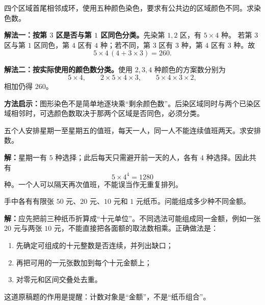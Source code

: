\begin{examplebox}
  四个区域首尾相邻成环，使用五种颜色染色，要求有公共边的区域颜色不同。求染色数。

  \begin{center}
  \end{center}

  \textbf{解法一：按第 $3$ 区是否与第 $1$ 区同色分类。}先染第 $1,2$ 区，有 $5\times4$ 种。
  若第 $3$ 区与第 $1$ 区同色，第 $4$ 区有 $4$ 种；若不同，第 $3$ 区有 $3$ 种，第 $4$ 区有 $3$ 种。故
  \[
    5\times4\,(4+3\times3)=260.
  \]

  \textbf{解法二：按实际使用的颜色数分类。}使用 $2,3,4$ 种颜色的方案数分别为
  \[
    5\times4,\qquad
    2\times5\times4\times3,\qquad
    5\times4\times3\times2,
  \]
  相加仍得 $260$。

  \textbf{方法启示：}图形染色不是简单地逐块乘“剩余颜色数”。后染区域同时与两个已染区域相邻时，可选颜色数取决于那两个区域是否同色，必须分类。
\end{examplebox}

\begin{examplebox}
  五个人安排星期一至星期五的值班，每天一人，同一人不能连续值班两天。求安排数。

  \textbf{解：}星期一有 $5$ 种选择；此后每天只需避开前一天的人，各有 $4$ 种选择。因此共有
  \[
    5\times4^4=1280
  \]
  种。一个人可以隔天再次值班，不能误当作无重复排列。
\end{examplebox}

\begin{examplebox}
  手中各有有限张 $50$ 元、$20$ 元、$10$ 元和 $1$ 元纸币。问能组成多少种不同金额。

  \textbf{解：}应先把前三种纸币折算成“十元单位”。不同选法可能组成同一金额，例如一张 $20$ 元与两张 $10$ 元，不能直接把各面额的取法数相乘。正确做法是：
  \begin{enumerate}
    \item 先确定可组成的十元整数是否连续，并列出缺口；
    \item 再把可用的一元张数加到每个十元金额上；
    \item 对零元和区间交叠处去重。
  \end{enumerate}
  这道原稿题的作用是提醒：计数对象是“金额”，不是“纸币组合”。
\end{examplebox}

